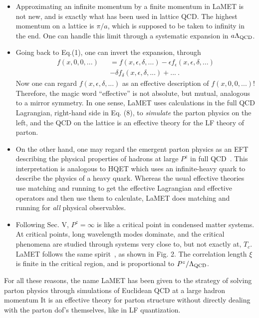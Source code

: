 \documentclass[prd,aps,twocolumn,preprintnumbers,showpacs,nofootinbib,superscriptaddress,notitlepage]{revtex4-1}
\begin{document}
\begin{itemize}
\item{Approximating an infinite momentum by a finite momentum in LaMET
is not new, and is exactly what has been used in lattice QCD. The highest momentum
on a lattice is $\pi/a$, which is supposed to be taken to infinity in the end.
One can handle this limit through a systematic expansion in
$a\Lambda_{\rm QCD}$.}
\item{Going back to Eq.(1), one can invert the expansion,
through
\begin{eqnarray}
    f(x,0,0,...) &&= f(x,\epsilon,\delta,...)- \epsilon f_\epsilon(x,\epsilon,\delta,...)\nonumber\\
        && -\delta f_\delta (x,\epsilon,\delta,...)+... \ .
\end{eqnarray}
Now one can regard $f(x,\epsilon,\delta,...)$ as an effective description
of $f(x,0,0,...)$! Therefore, the magic word ``effective'' is not absolute, but
mutual, analogous to a mirror symmetry. In one sense, LaMET
uses calculations in the full QCD Lagrangian, right-hand side in Eq. (8),
to {\it simulate} the parton physics on the left, and the
QCD on the lattice is an effective theory for the LF theory of parton.}
\item{On the other hand, one may regard the emergent parton physics
as an EFT describing the physical properties of hadrons at large $P^z$ in full QCD~\cite{Ji:2014gla}.
This interpretation is analogous to HQET which uses an infinite-heavy quark
to describe the physics of a heavy quark. Whereas the usual effective theories
use matching and running to get the effective Lagrangian and effective operators and then use
them to calculate, LaMET does
matching and running for {\it all} physical observables.}
\item{Following Sec. V, $P^z=\infty$ is like a critical point
in condensed matter systems. At critical points,
long wavelength modes dominate, and the critical phenomena
are studied through systems very close to, but
not exactly at, $T_c$. LaMET follows the same spirit~\cite{Ji:2014gla}, as shown in Fig. 2.
The correlation length $\xi$ is finite in the critical region, and is proportional to
$P^z/\Lambda_{\rm QCD}$.}
\end{itemize}

For all these reasons, the name LaMET has been given to
the strategy of solving parton physics through simulations
of Euclidean QCD at a large hadron momentum
It is an effective theory for parton structure
without directly dealing with the parton dof's themselves,
like in LF quantization.
\end{document}
